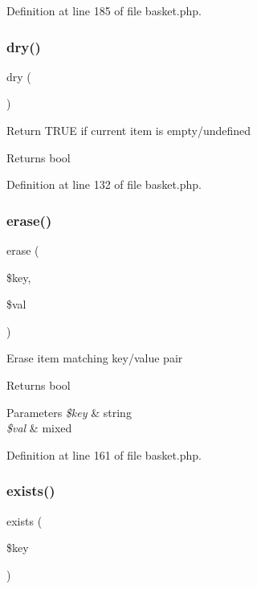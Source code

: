 Definition at line 185 of file basket.\+php.

\hypertarget{class_basket_acc3a900450447c51540aaa9dec5959a4}{}\label{class_basket_acc3a900450447c51540aaa9dec5959a4} 
\subsubsection{\texorpdfstring{dry()}{dry()}}
{\footnotesize\ttfamily dry (\begin{DoxyParamCaption}{ }\end{DoxyParamCaption})}

Return T\+R\+UE if current item is empty/undefined \begin{DoxyReturn}{Returns}
bool 
\end{DoxyReturn}


Definition at line 132 of file basket.\+php.

\hypertarget{class_basket_ae25b1f24d58b7b7e6cd08fc07183fae5}{}\label{class_basket_ae25b1f24d58b7b7e6cd08fc07183fae5} 
\subsubsection{\texorpdfstring{erase()}{erase()}}
{\footnotesize\ttfamily erase (\begin{DoxyParamCaption}\item[{}]{\$key,  }\item[{}]{\$val }\end{DoxyParamCaption})}

Erase item matching key/value pair \begin{DoxyReturn}{Returns}
bool 
\end{DoxyReturn}

\begin{DoxyParams}{Parameters}
{\em \$key} & string \\
\hline
{\em \$val} & mixed \\
\hline
\end{DoxyParams}


Definition at line 161 of file basket.\+php.

\hypertarget{class_basket_ace1ae5be37bf26c172cc7ea4e1a65e26}{}\label{class_basket_ace1ae5be37bf26c172cc7ea4e1a65e26} 
\subsubsection{\texorpdfstring{exists()}{exists()}}
{\footnotesize\ttfamily exists (\begin{DoxyParamCaption}\item[{}]{\$key }\end{DoxyParamCaption})}

